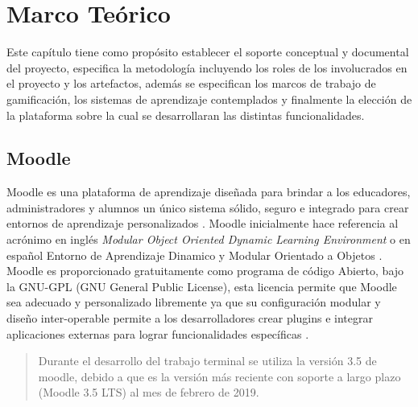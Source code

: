 \chapter{Marco Teórico}
\label{ch:marcoTeorico}

 Este capítulo tiene como propósito establecer el soporte conceptual y documental del proyecto,
 especifica la metodología incluyendo los roles de los involucrados en el proyecto y los artefactos,
 además se especifican los marcos de trabajo de gamificación, los sistemas de aprendizaje contemplados
 y finalmente la elección de la plataforma sobre la cual se desarrollaran las distintas funcionalidades.

 
 
 

\section{Moodle}

Moodle es una plataforma de aprendizaje diseñada para brindar a los educadores, administradores y alumnos un único sistema sólido, seguro e integrado para crear entornos de aprendizaje personalizados \cite{aboutMoodle}. Moodle inicialmente hace referencia al acrónimo en inglés {\it Modular Object Oriented Dynamic Learning Environment} o en español Entorno de Aprendizaje Dinamico y Modular Orientado a Objetos \cite{aboutMoodle19}.\\

\noindent Moodle es proporcionado gratuitamente como programa de código Abierto, bajo la GNU-GPL (GNU General Public License), esta licencia permite que Moodle sea adecuado y personalizado libremente ya que su configuración modular y diseño inter-operable permite a los desarrolladores crear plugins e integrar aplicaciones externas para lograr funcionalidades específicas \cite{aboutMoodle}.


\begin{quote}
    Durante el desarrollo del trabajo terminal se utiliza la versión 3.5 de moodle, debido a que es la versión más reciente con soporte a largo plazo (Moodle 3.5 LTS) al mes de febrero de 2019. \cite{moodleHistorial}
\end{quote}

